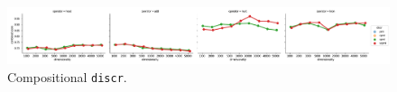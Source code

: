 \begin{figure}[b]
  \centering

  \includegraphics[width=1.1\textwidth]{supplement/figures/compositional-interaction-discr}

  \caption{Compositional \texttt{discr}.}
  \label{fig:compositional-discr}
\end{figure}
